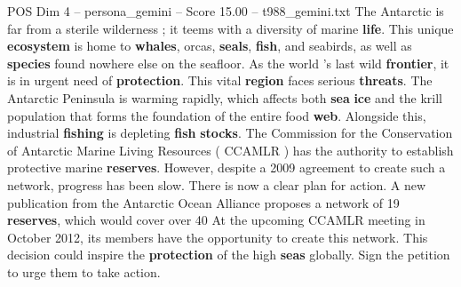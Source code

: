 \begin{textsample}{POS Dim 4 – persona\_gemini – Score 15.00 – t988\_gemini.txt}  \label{ex:f4_pos_046}
The Antarctic is far from a sterile wilderness ; it teems with a diversity of marine \textbf{life}.
This unique \textbf{ecosystem} is home to \textbf{whales}, orcas, \textbf{seals}, \textbf{fish}, and seabirds, as well as \textbf{species} found nowhere else on the seafloor.
As the world 's last wild \textbf{frontier}, it is in urgent need of \textbf{protection}.
This vital \textbf{region} faces serious \textbf{threats}.
The Antarctic Peninsula is warming rapidly, which affects both \textbf{sea} \textbf{ice} and the krill population that forms the foundation of the entire food \textbf{web}.
Alongside this, industrial \textbf{fishing} is depleting \textbf{fish} \textbf{stocks}.
The Commission for the Conservation of Antarctic Marine Living Resources ( CCAMLR ) has the authority to establish protective marine \textbf{reserves}.
However, despite a 2009 agreement to create such a network, progress has been slow.
There is now a clear plan for action.
A new publication from the Antarctic Ocean Alliance proposes a network of 19 \textbf{reserves}, which would cover over 40 %
At the upcoming CCAMLR meeting in October 2012, its members have the opportunity to create this network.
This decision could inspire the \textbf{protection} of the high \textbf{seas} globally.
Sign the petition to urge them to take action.

\end{textsample}
